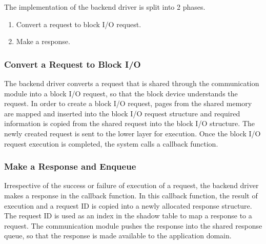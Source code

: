 The implementation of the backend driver is split into 2 phases. 
\begin{enumerate}
\item Convert a request to block I/O request. 
\item Make a response.
\end{enumerate}

\subsubsection*{Convert a Request to Block I/O}
\label{subsec:createbio}
The backend driver converts a request that is shared through the
communication module into a block I/O request, so that the block device
understands the request. In order to create a block I/O request, pages from
the shared memory are mapped and inserted into the block I/O request structure and
required information is copied from the shared request into the block I/O
structure. The newly created request is sent to the lower layer for execution. 
Once the block I/O request execution is completed, the system calls a callback function.

\subsubsection*{Make a Response and Enqueue}
Irrespective of the success or failure of execution of a request,
the backend driver makes a response in the callback function. In this
callback function, the result of execution and a request ID is
copied into a newly allocated response structure. The request ID is used
as an index in the shadow table to map a response to a request. The
communication module pushes the response into the shared response queue, 
so that the response is made available to the application domain.

